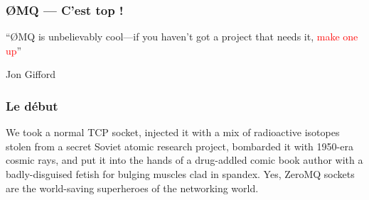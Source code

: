 \documentclass{beamer}
\newcommand\red[1]{\textcolor{red}{#1}}
\begin{document}
\begin{frame}
  \frametitle{ØMQ --- C'est top !}

  ``ØMQ is unbelievably cool---if you haven't got a project that needs it, \red{make one up}''

  Jon Gifford
\end{frame}

\begin{frame}
  \frametitle{Le début}

  We took a normal TCP socket, injected it with a mix of radioactive
  isotopes stolen from a secret Soviet atomic research project,
  bombarded it with 1950-era cosmic rays, and put it into the hands of a
  drug-addled comic book author with a badly-disguised fetish for
  bulging muscles clad in spandex. Yes, ZeroMQ sockets are the
  world-saving superheroes of the networking world.
\end{frame}
\end{document}
